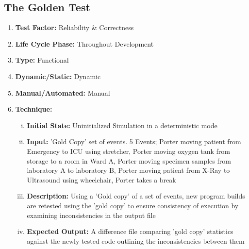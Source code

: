 \documentclass[paper=letter, fontsize=10pt]{scrartcl}
\numberwithin{equation}{section}		%
\numberwithin{figure}{section}			%
\numberwithin{table}{section}				%
\begin{document}
\subsection{The Golden Test}
\begin{enumerate}[]
	\item \textbf{Test Factor:} Reliability \& Correctness 
	\item \textbf{Life Cycle Phase:} Throughout Development
	\item \textbf{Type:} Functional
	\item \textbf{Dynamic/Static:} Dynamic
	\item \textbf{Manual/Automated:} Manual
	\item \textbf{Technique:}
		\begin{enumerate}[(i)]
			\item \textbf{Initial State:} Uninitialized Simulation in a deterministic mode
			\item \textbf{Input:} 'Gold Copy' set of events. 5 Events; Porter moving patient from Emergency to ICU using stretcher, Porter moving oxygen tank from storage to a room in Ward A, Porter moving specimen samples from laboratory A to laboratory B, Porter moving patient from X-Ray to Ultrasound using wheelchair, Porter takes a break 
			\item \textbf{Description:} Using a 'Gold copy' of a set of events, new program builds are retested using the 'gold copy' to ensure consistency of execution by examining inconsistencies in the output file
			\item \textbf{Expected Output:} A difference file comparing 'gold copy' statistics against the newly tested code outlining the inconsistencies between them 
		\end{enumerate}
\end{enumerate}
\end{document}
